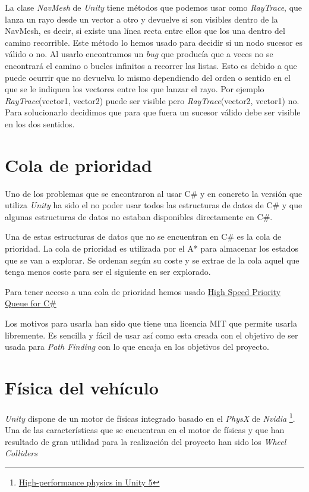 La clase \textit{NavMesh} de \textit{Unity} tiene métodos que podemos usar como \textit{RayTrace}, que lanza un rayo desde un vector a otro y devuelve si son visibles dentro de la NavMesh, es decir, si existe una línea recta entre ellos que los una dentro del camino recorrible. Este método lo hemos usado para decidir si un nodo sucesor es válido o no. Al usarlo encontramos un \textit{bug} que producía que a veces no se encontrará el camino o bucles infinitos a recorrer las listas. Esto es debido a que puede ocurrir que no devuelva lo mismo dependiendo del orden o sentido en el que se le indiquen los vectores entre los que lanzar el rayo. Por ejemplo \textit{RayTrace}(vector1, vector2) puede ser visible pero \textit{RayTrace}(vector2, vector1) no. Para solucionarlo decidimos que para que fuera un sucesor válido debe ser visible en los dos sentidos.

\section{Cola de prioridad}
Uno de los problemas que se encontraron al usar C\# y en concreto la versión que utiliza \textit{Unity} ha sido el no poder usar todos las estructuras de datos de C\# y que algunas estructuras de datos no estaban disponibles directamente en C\#.

Una de estas estructuras de datos que no se encuentran en C\# es la cola de prioridad. La cola de prioridad es utilizada por el A* para almacenar los estados que se van a explorar. Se ordenan según su coste y se extrae de la cola aquel que tenga menos coste para ser el siguiente en ser explorado.

Para tener acceso a una cola de prioridad hemos usado
\href{https://github.com/BlueRaja/High-Speed-Priority-Queue-for-C-Sharp}{High Speed Priority Queue for C\# \cite{bluerajacola}}

Los motivos para usarla han sido que tiene una licencia MIT que permite usarla libremente. Es sencilla y fácil de usar así como esta creada con el objetivo de ser usada para \textit{Path Finding} con lo que encaja en los objetivos del proyecto.

\section{Física del vehículo}
\textit{Unity} dispone de un motor de físicas integrado basado en el \textit{PhysX} de \textit{Nvidia} \footnote{\href{https://blogs.unity3d.com/es/2014/07/08/high-performance-physics-in-unity-5/}{High-performance physics in Unity 5}}. Una de las características que se encuentran en el motor de físicas y que han resultado de gran utilidad para la realización del proyecto han sido los \textit{Wheel Colliders}

